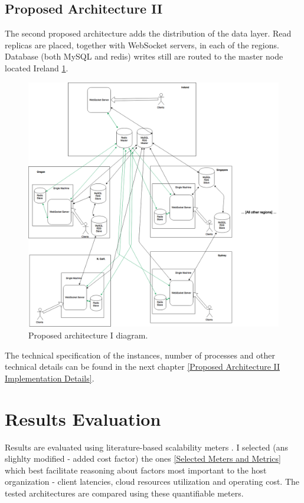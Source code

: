 \documentclass{uvamscse}
\begin{document}
\subsection{Proposed Architecture II}\label{Proposed Architecture II}
The second proposed architecture adds the distribution of the data layer. Read replicas are placed, together with WebSocket servers, in each of the regions. Database (both MySQL and redis) writes still are routed to the master node located Ireland \ref{figure:archprop2}.

\begin{figure}[H]
\centering
\includegraphics[scale=0.3]{archprop2}
\caption{Proposed architecture I diagram.}
\label{figure:archprop2}
\end{figure}

The technical specification of the instances, number of processes and other technical details can be found in the next chapter \ref{Proposed Architecture II Implementation Details}.

\section{Results Evaluation}
Results are evaluated using literature-based scalability meters \cite{Models}. I selected (ans slighlty modified - added cost factor) the ones \ref{Selected Meters and Metrics} which best facilitate reasoning about factors most important to the host organization - client latencies, cloud resources utilization and operating cost. The tested architectures are compared using these quantifiable meters.
\end{document}
